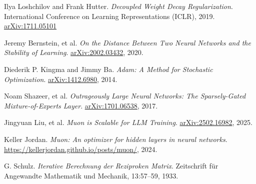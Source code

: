 \documentclass[11pt, a4paper]{article}
\begin{document}
\begin{thebibliography}{9}

    Ilya Loshchilov and Frank Hutter.
    \textit{Decoupled Weight Decay Regularization}.
    International Conference on Learning Representations (ICLR), 2019.  
    \href{https://arxiv.org/abs/1711.05101}{arXiv:1711.05101}
    
    Jeremy Bernstein, et al.
    \textit{On the Distance Between Two Neural Networks and the Stability of Learning}.  
    \href{https://arxiv.org/abs/2002.03432}{arXiv:2002.03432}, 2020.
    
    Diederik P. Kingma and Jimmy Ba.  
    \textit{Adam: A Method for Stochastic Optimization}.  
    \href{https://arxiv.org/abs/1412.6980}{arXiv:1412.6980}, 2014.
    
    Noam Shazeer, et al.  
    \textit{Outrageously Large Neural Networks: The Sparsely-Gated Mixture-of-Experts Layer}.  
    \href{https://arxiv.org/abs/1701.06538}{arXiv:1701.06538}, 2017.
    
    Jingyuan Liu, et al.  
    \textit{Muon is Scalable for LLM Training}.  
    \href{https://arxiv.org/abs/2502.16982}{arXiv:2502.16982}, 2025.
    
    Keller Jordan.  
    \textit{Muon: An optimizer for hidden layers in neural networks}.  
    \url{https://kellerjordan.github.io/posts/muon/}, 2024.
    
    G. Schulz.  
    \textit{Iterative Berechnung der Reziproken Matrix}.  
    Zeitschrift für Angewandte Mathematik und Mechanik, 13:57–59, 1933.
    
    \end{thebibliography}
    
\end{document}
